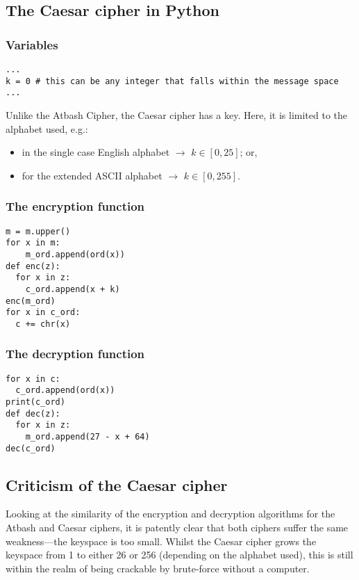 \documentclass{AIAA}
\begin{document}
\subsection{The Caesar cipher in Python}

\subsubsection{Variables}
\begin{verbatim}
...
k = 0 # this can be any integer that falls within the message space
...
\end{verbatim}
Unlike the Atbash Cipher, the Caesar cipher has a key. Here, it is limited to the alphabet used, e.g.:
\begin{itemize}
	\item in the single case English alphabet $\longrightarrow$ $k \in [0,25]$; or,
	\item for the extended ASCII alphabet $\longrightarrow$ $k \in [0,255]$.
\end{itemize}

\subsubsection{The encryption function}
\begin{verbatim}
m = m.upper()
for x in m:
    m_ord.append(ord(x))
def enc(z):
  for x in z:
    c_ord.append(x + k)
enc(m_ord)
for x in c_ord:
  c += chr(x)
\end{verbatim}

\subsubsection{The decryption function}
\begin{verbatim}
for x in c:
  c_ord.append(ord(x))
print(c_ord)
def dec(z):
  for x in z:
    m_ord.append(27 - x + 64)
dec(c_ord)
\end{verbatim}

\subsection{Criticism of the Caesar cipher}
Looking at the similarity of the encryption and decryption algorithms for the Atbash and Caesar ciphers, it is patently clear that both ciphers suffer the same weakness---the keyspace is too small. Whilst the Caesar cipher grows the keyspace from 1 to either 26 or 256 (depending on the alphabet used), this is still within the realm of being crackable by brute-force without a computer.
\end{document}

